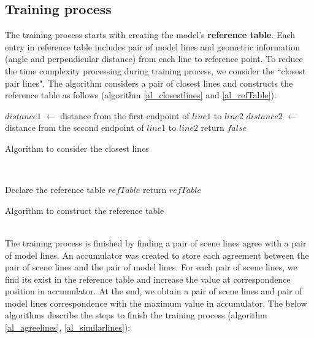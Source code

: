 \subsection{Training process}
The training process starts with creating the model's \textbf{reference table}. Each entry in reference table includes pair of model lines and geometric information (angle and perpendicular distance) from each line to reference point. To reduce the time complexity processing during training process, we consider the ``closest pair lines". The algorithm considers a pair of closest lines and constructs the reference table as follows (algorithm \ref{al_closestlines} and \ref{al_refTable}):\\[0.2cm]
\begin{algorithm}[H]
\Indm 
{}
\SetAlgoLined
{}
\Indp
$distance1$ $\leftarrow$ distance from the first endpoint of $line1$ to $line2$\;
$distance2$ $\leftarrow$  distance from the second endpoint of $line1$ to $line2$\;
return $false$\;
\caption{Algorithm to consider the closest lines}
\label{al_closestlines}
\end{algorithm}~\\[0.2cm]
\begin{algorithm}[H]
\Indm 
{}
\SetAlgoLined
{}
\Indp
Declare the reference table $refTable$ \;
return $refTable$ \;
\caption{Algorithm to construct the reference table}
\label{al_refTable}
\end{algorithm}~\\
The training process is finished by finding a pair of scene lines agree with a pair of model lines. An accumulator was created to store each agreement between the pair of scene lines and the pair of model lines. For each pair of scene lines, we find its exist in the reference table and increase the value at correspondence position in accumulator. At the end, we obtain a pair of scene lines and pair of model lines correspondence with the maximum value in accumulator. The below algorithms describe the steps to finish the training process (algorithm \ref{al_agreelines},  \ref{al_similarlines}):\\[0.2cm]
